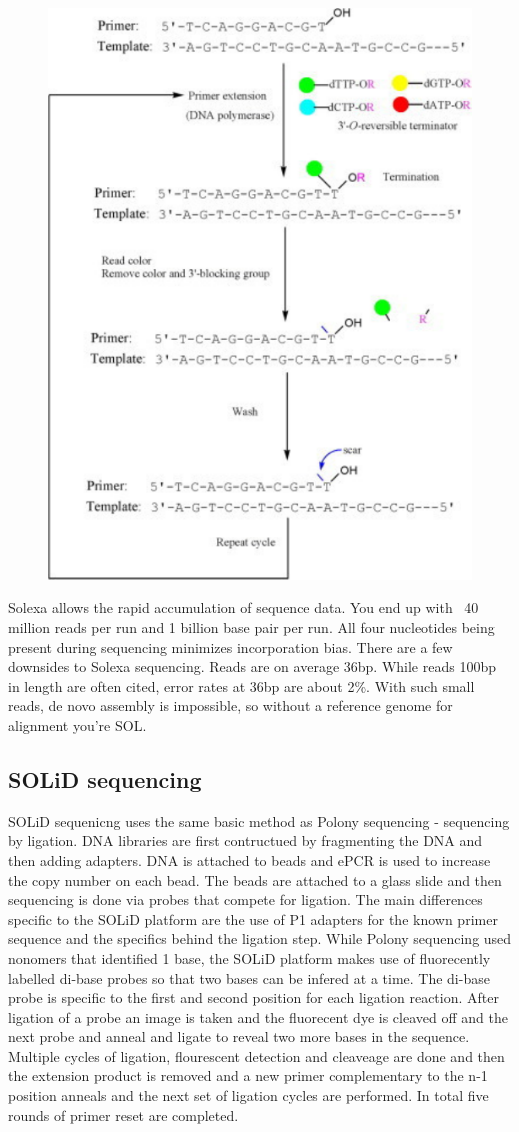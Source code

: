 \documentclass{report}\usepackage[]{graphicx}\usepackage[]{color}
\begin{document}
\begin{figure}[H]
\centering
    \includegraphics[width=.3\textwidth]{images/Solexa.pdf}
    \caption{}\label{fig:Solexa} 
\end{figure}

Solexa allows the rapid accumulation of sequence data. You end up with ~40 million reads per run and 
1 billion base pair per run. All four nucleotides being present during sequencing minimizes
incorporation bias. 
There are a few downsides to Solexa sequencing. Reads are on average 36bp. While reads 100bp in length
are often cited, error rates at 36bp are about 2\%. With such small reads, de novo assembly is impossible, so without 
a reference genome for alignment you're SOL.  

\subsection*{SOLiD sequencing}
SOLiD sequenicng uses the same basic method as Polony sequencing - sequencing by ligation. DNA libraries are first
contructued by fragmenting the DNA and then adding adapters. DNA is attached to beads and ePCR is used to 
increase the copy number on each bead. The beads are attached to a glass slide and then sequencing is done via 
probes that compete for ligation. The main differences specific to the SOLiD platform are the use of P1 adapters 
for the known primer sequence and the specifics behind the ligation step. 
While Polony sequencing used nonomers that identified 1 base, the SOLiD platform makes use of 
fluorecently labelled di-base probes so that two bases can be infered at a time. The di-base probe
is specific to the first and second position for each ligation reaction. After ligation of a probe an image is taken
and the fluorecent dye is cleaved off and the next probe and anneal and ligate to reveal two more bases in the
sequence. Multiple cycles of ligation, flourescent detection and cleaveage are done and then the extension product
is removed and a new primer complementary to the n-1 position anneals and the next set of ligation cycles are
performed. In total five rounds of primer reset are completed. 
\end{document}
